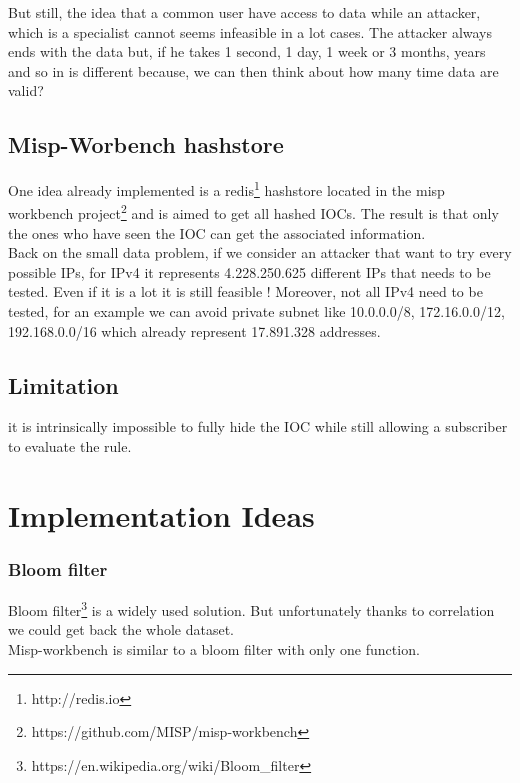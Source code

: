 \documentclass{eplmastersthesis}
\begin{document}
But still, the idea that a common user have access to data while an attacker, which is a specialist cannot seems infeasible in a lot cases. The attacker always ends with the data but, if he takes 1 second, 1 day, 1 week or 3 months, years and so in is different because, we can then think about how many time data are valid? \\


\section{Misp-Worbench hashstore}

One idea already implemented is a redis\footnote{http://redis.io} hashstore located in the misp workbench project\footnote{https://github.com/MISP/misp-workbench} and is aimed to get all hashed IOCs.
The result is that only the ones who have seen the IOC can get the associated information. \\
Back on the small data problem, if we consider an attacker that want to try every possible IPs, for IPv4 it represents 4.228.250.625 different IPs that needs to be tested. Even if it is a lot it is still feasible ! Moreover, not all IPv4 need to be tested, for an example we can avoid private subnet like 10.0.0.0/8, 172.16.0.0/12, 192.168.0.0/16 which already represent 17.891.328 addresses.


\section{Limitation}
it is intrinsically impossible to fully hide the IOC while still allowing a subscriber to evaluate the rule. 


\chapter{Implementation Ideas}
\subsection{Bloom filter}
Bloom filter\footnote{https://en.wikipedia.org/wiki/Bloom\_filter} is a widely used solution.
But unfortunately thanks to correlation we could get back the whole dataset.\\
Misp-workbench is similar to a bloom filter with only one function.
\end{document}
